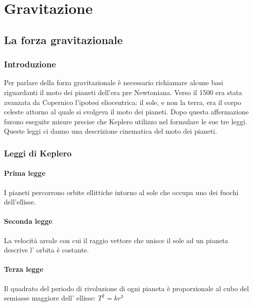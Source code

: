 \documentclass[class=book, crop=false, oneside, 12pt]{standalone}
\begin{document}
\chapter{Gravitazione}

\section{La forza gravitazionale}

\subsection{Introduzione}

Per parlare della forza gravitazionale è necessario richiamare alcune basi riguardanti il moto dei pianeti dell'era pre Newtoniana.\newline
Verso il 1500 era stata avanzata da Copernico l'ipotesi eliocentrica: il sole, e non la terra, era il corpo celeste attorno al quale si svolgeva il moto dei pianeti.\newline
Dopo questa affermazione furono eseguite misure precise che Keplero utilizzo nel formulare le sue tre leggi.
Queste leggi ci danno una descrizione cinematica del moto dei pianeti.

\subsection{Leggi di Keplero}
\subsubsection{Prima legge}

I pianeti percorrono orbite ellittiche intorno al sole che occupa uno dei fuochi dell'ellisse. 

\subsubsection{Seconda legge}

La velocità areale con cui il raggio vettore che unisce il sole ad un pianeta descrive l' orbita è costante. 

\subsubsection{Terza legge}

Il quadrato del periodo di rivoluzione di ogni pianeta è proporzionale al cubo del semiasse maggiore dell' ellisse: \(T^2 = k r^3\) 
\end{document}

